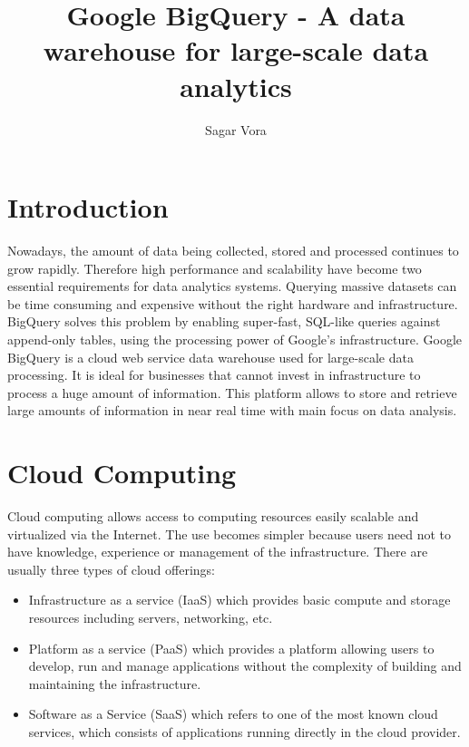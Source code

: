 \documentclass[9pt,twocolumn,twoside]{../../styles/osajnl}
\title{Google BigQuery - A data warehouse for large-scale data analytics}
\author[1]{Sagar Vora}
\affil[1]{School of Informatics and Computing, Bloomington, IN 47408, U.S.A.}
\begin{document}
\maketitle
{}
\section{Introduction}
Nowadays, the amount of data being collected, stored and processed
continues to grow rapidly. Therefore high performance and scalability
have become two essential requirements for data analytics
systems. Querying massive datasets can be time consuming and expensive
without the right hardware and infrastructure. BigQuery solves this
problem by enabling super-fast, SQL-like queries against append-only
tables, using the processing power of Google's infrastructure. Google
BigQuery \cite{www-bigquery} \cite{bigquery-paper} is a cloud web
service data warehouse used for large-scale data processing. It is
ideal for businesses that cannot invest in infrastructure to process a
huge amount of information. This platform allows to store and retrieve
large amounts of information in near real time with main focus on data
analysis.

\section{Cloud Computing}
Cloud computing \cite{www-cloudcomputing}
\cite{benchmark-for-cloud-paper} allows access to computing resources
easily scalable and virtualized via the Internet. The use becomes
simpler because users need not to have knowledge, experience or
management of the infrastructure. There are usually three types of
cloud offerings:\begin{itemize} \item Infrastructure as a service
  (IaaS) \CE which provides basic compute and storage resources including
  servers, networking, etc. \item Platform as a service (PaaS) \CE which
  provides a platform allowing users to develop, run and manage
  applications without the complexity of building and maintaining the
  infrastructure. \item Software as a Service (SaaS) \CE which refers to
  one of the most known cloud services, which consists of applications
  running directly in the cloud provider. \end{itemize}
\noindent
\end{document}
